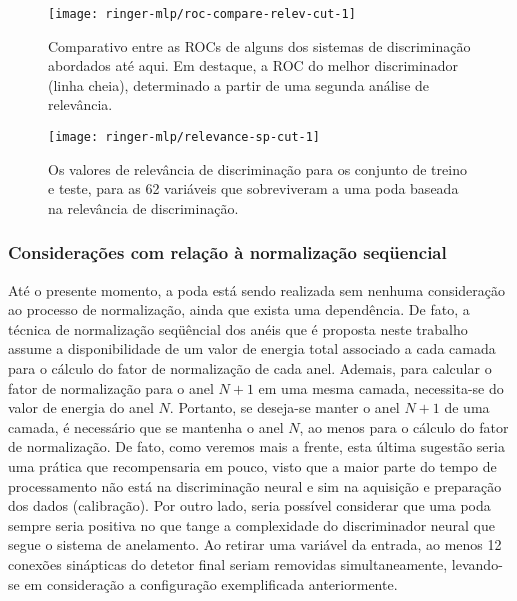 \begin{figure}
\begin{center}
\texttt{[image: ringer-mlp/roc-compare-relev-cut-1]}
\end{center}
\caption{Comparativo entre as ROCs de alguns dos sistemas de discriminação
abordados até aqui. Em destaque, a ROC do melhor discriminador (linha cheia),
determinado a partir de uma segunda análise de relevância.}
\label{fig:ringer-mlp-relev-cut-1}
\end{figure}

\begin{figure}
\begin{center}
\texttt{[image: ringer-mlp/relevance-sp-cut-1]}
\end{center}
\caption{Os valores de relevância de discriminação para os conjunto de treino
e teste, para as 62 variáveis que sobreviveram a uma poda baseada na
relevância de discriminação.}
\label{fig:cut-1-relevance-sp}
\end{figure}

\subsubsection{Considerações com relação à normalização seqüencial}

Até o presente momento, a poda está sendo realizada sem nenhuma consideração
ao processo de normalização, ainda que exista uma dependência. De fato, a
técnica de normalização seqüêncial dos anéis que é proposta neste trabalho
assume a disponibilidade de um valor de energia total associado a cada camada
para o cálculo do fator de normalização de cada anel. Ademais, para calcular o
fator de normalização para o anel $N+1$ em uma mesma camada, necessita-se do
valor de energia do anel $N$. Portanto, se deseja-se manter o anel $N+1$ de
uma camada, é necessário que se mantenha o anel $N$, ao menos para o cálculo
do fator de normalização. De fato, como veremos mais a frente, esta última
sugestão seria uma prática que recompensaria em pouco, visto que a maior parte
do tempo de processamento não está na discriminação neural e sim na aquisição
e preparação dos dados (calibração). Por outro lado, seria possível considerar
que uma poda sempre seria positiva no que tange a complexidade do
discriminador neural que segue o sistema de anelamento. Ao retirar uma
variável da entrada, ao menos 12 conexões sinápticas do detetor final seriam
removidas simultaneamente, levando-se em consideração a configuração
exemplificada anteriormente. 

